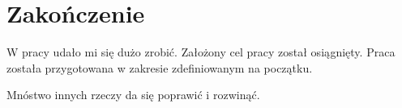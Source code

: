 
\chapter*{Zakończenie}

W pracy udało mi się dużo zrobić. Założony cel pracy został osiągnięty. Praca została przygotowana w zakresie zdefiniowanym na początku. \lipsum[17]

Mnóstwo innych rzeczy da się poprawić i rozwinąć. \lipsum[23]